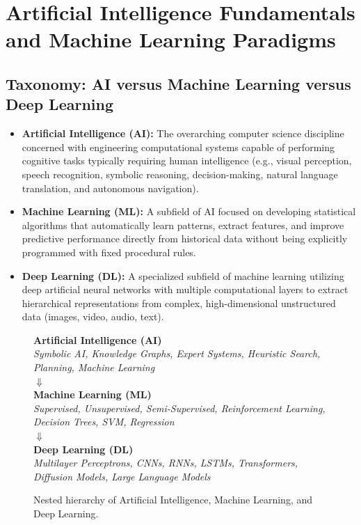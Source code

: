 \section{Artificial Intelligence Fundamentals and Machine Learning Paradigms}
\label{sec:ai_fundamentals}

\subsection{Taxonomy: AI versus Machine Learning versus Deep Learning}
\begin{itemize}
    \item \textbf{Artificial Intelligence (AI):} The overarching computer science discipline concerned with engineering computational systems capable of performing cognitive tasks typically requiring human intelligence (e.g., visual perception, speech recognition, symbolic reasoning, decision-making, natural language translation, and autonomous navigation).
    \item \textbf{Machine Learning (ML):} A subfield of AI focused on developing statistical algorithms that automatically learn patterns, extract features, and improve predictive performance directly from historical data without being explicitly programmed with fixed procedural rules.
    \item \textbf{Deep Learning (DL):} A specialized subfield of machine learning utilizing deep artificial neural networks with multiple computational layers to extract hierarchical representations from complex, high-dimensional unstructured data (images, video, audio, text).
\end{itemize}

\begin{figure}[htbp]
\centering
\small
\begin{tcolorbox}[colback=blue!5!white,colframe=blue!75!black,title=\textbf{The Hierarchical Relationship of AI, Machine Learning, and Deep Learning}]
\centering
\textbf{Artificial Intelligence (AI)} \\
\textit{Symbolic AI, Knowledge Graphs, Expert Systems, Heuristic Search, Planning, Machine Learning} \\[4pt]
$\Downarrow$ \\
\textbf{Machine Learning (ML)} \\
\textit{Supervised, Unsupervised, Semi-Supervised, Reinforcement Learning, Decision Trees, SVM, Regression} \\[4pt]
$\Downarrow$ \\
\textbf{Deep Learning (DL)} \\
\textit{Multilayer Perceptrons, CNNs, RNNs, LSTMs, Transformers, Diffusion Models, Large Language Models}
\end{tcolorbox}
\caption{Nested hierarchy of Artificial Intelligence, Machine Learning, and Deep Learning.}
\label{fig:ai_ml_dl_hierarchy}
\end{figure}

